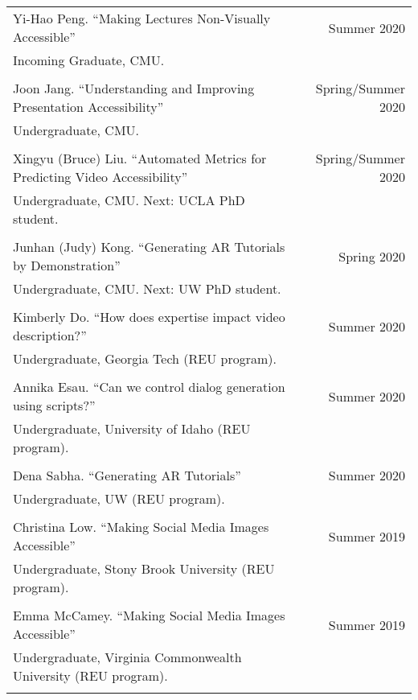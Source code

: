 \begin{longtable}{Xr}
	Yi-Hao Peng. ``Making Lectures Non-Visually Accessible'' & Summer 2020 \\
	Incoming Graduate, CMU. &  \\
	\\

	Joon Jang. ``Understanding and Improving Presentation Accessibility'' & Spring/Summer 2020 \\
	Undergraduate, CMU. &  \\
	\\

	Xingyu (Bruce) Liu. ``Automated Metrics for Predicting Video Accessibility'' & Spring/Summer 2020 \\
	Undergraduate, CMU. Next: UCLA PhD student. &  \\
	\\

	Junhan (Judy) Kong. ``Generating AR Tutorials by Demonstration'' & Spring 2020 \\
	Undergraduate, CMU. Next: UW PhD student. &  \\
	\\

	Kimberly Do. ``How does expertise impact video description?'' & Summer 2020 \\
	Undergraduate, Georgia Tech (REU program). &  \\
	\\

	Annika Esau. ``Can we control dialog generation using scripts?'' & Summer 2020 \\
	Undergraduate, University of Idaho (REU program). &  \\
	\\

	Dena Sabha. ``Generating AR Tutorials'' & Summer 2020 \\
	Undergraduate, UW (REU program). &  \\
	\\

	Christina Low. ``Making Social Media Images Accessible'' & Summer 2019 \\
	Undergraduate, Stony Brook University (REU program). &  \\
	\\

	Emma McCamey. ``Making Social Media Images Accessible'' & Summer 2019 \\
	Undergraduate, Virginia Commonwealth University (REU program). &  \\
	\\


\end{longtable}
